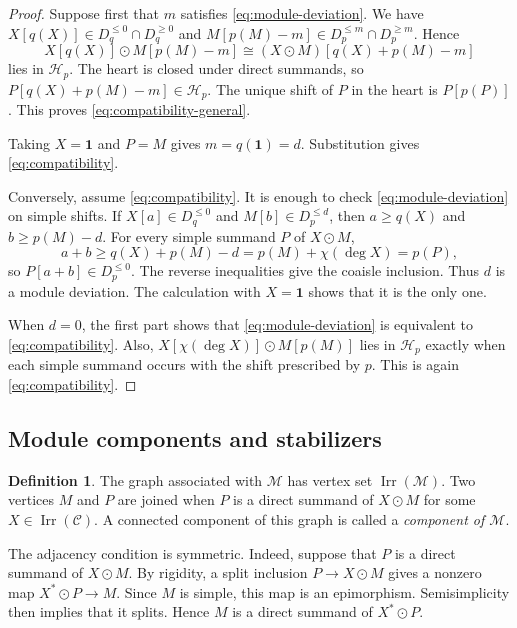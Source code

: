 \documentclass[11pt]{amsart}
\newcommand{\C}{\mathcal C}
\newcommand{\M}{\mathcal M}
\newcommand{\Hh}{\mathcal H}
\newcommand{\one}{\mathbf 1}
\newcommand{\Irr}{\operatorname{Irr}}
\theoremstyle{definition}
\newtheorem{definition}[theorem]{Definition}
\theoremstyle{remark}
\theoremstyle{plain}
\begin{document}
\begin{proof}
Suppose first that $m$ satisfies \eqref{eq:module-deviation}. We have $X[q(X)]\in D_q^{\leq0}\cap D_q^{\geq0}$ and $M[p(M)-m]\in D_p^{\leq m}\cap D_p^{\geq m}$. Hence
\[
X[q(X)]\odot M[p(M)-m]\cong(X\odot M)[q(X)+p(M)-m]
\]
lies in $\Hh_p$. The heart is closed under direct summands, so $P[q(X)+p(M)-m]\in\Hh_p$. The unique shift of $P$ in the heart is $P[p(P)]$. This proves \eqref{eq:compatibility-general}.

Taking $X=\one$ and $P=M$ gives $m=q(\one)=d$. Substitution gives \eqref{eq:compatibility}.

Conversely, assume \eqref{eq:compatibility}. It is enough to check \eqref{eq:module-deviation} on simple shifts. If $X[a]\in D_q^{\leq0}$ and $M[b]\in D_p^{\leq d}$, then $a\geq q(X)$ and $b\geq p(M)-d$. For every simple summand $P$ of $X\odot M$,
\[
a+b\geq q(X)+p(M)-d=p(M)+\chi(\deg X)=p(P),
\]
so $P[a+b]\in D_p^{\leq0}$. The reverse inequalities give the coaisle inclusion. Thus $d$ is a module deviation. The calculation with $X=\one$ shows that it is the only one.

When $d=0$, the first part shows that \eqref{eq:module-deviation} is equivalent to \eqref{eq:compatibility}. Also, $X[\chi(\deg X)]\odot M[p(M)]$ lies in $\Hh_p$ exactly when each simple summand occurs with the shift prescribed by $p$. This is again \eqref{eq:compatibility}.
\end{proof}

\subsection{Module components and stabilizers}\label{subsec:module-components}

\begin{definition}\label{def:module-components}
The graph associated with $\M$ has vertex set $\Irr(\M)$. Two vertices $M$ and $P$ are joined when $P$ is a direct summand of $X\odot M$ for some $X\in\Irr(\C)$. A connected component of this graph is called a \emph{component of $\M$}.
\end{definition}

The adjacency condition is symmetric. Indeed, suppose that $P$ is a direct summand of $X\odot M$. By rigidity, a split inclusion $P\to X\odot M$ gives a nonzero map $X^*\odot P\to M$. Since $M$ is simple, this map is an epimorphism. Semisimplicity then implies that it splits. Hence $M$ is a direct summand of $X^*\odot P$.
\end{document}
